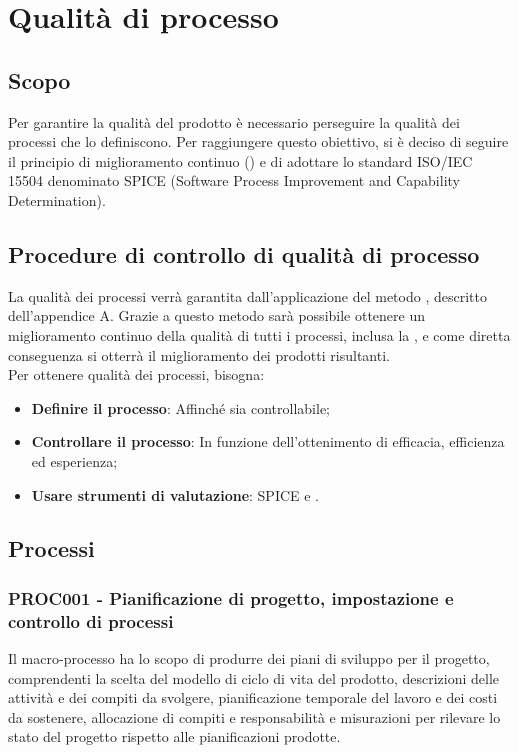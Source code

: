 \documentclass[PianoDiQualifica.tex]{subfiles}
\begin{document}
\chapter{Qualità di processo}

\section{Scopo} 
Per garantire la qualità del prodotto è necessario perseguire la qualità dei processi che lo definiscono.
Per raggiungere questo obiettivo, si è deciso di seguire il principio di miglioramento continuo () e di adottare lo standard ISO/IEC 15504 denominato SPICE (Software Process Improvement and Capability Determination).

\section{Procedure di controllo di qualità di processo}
La qualità dei processi verrà garantita dall'applicazione del metodo , descritto dell'appendice A. Grazie a questo metodo sarà possibile ottenere un miglioramento continuo della qualità di tutti i processi, inclusa la , e come diretta conseguenza si otterrà il miglioramento dei prodotti risultanti.\\Per ottenere qualità dei processi, bisogna:
\begin{itemize}
	\item \textbf{Definire il processo}: Affinché sia controllabile;
	\item \textbf{Controllare il processo}: In funzione dell'ottenimento di efficacia, efficienza ed esperienza;
	\item \textbf{Usare strumenti di valutazione}: SPICE e .
\end{itemize}

\section{Processi}

\subsection{PROC001 - Pianificazione di progetto, impostazione e controllo di processi}
Il macro-processo ha lo scopo di produrre dei piani di sviluppo per il progetto, comprendenti la scelta del modello di ciclo di vita del prodotto, descrizioni delle attività e dei compiti da svolgere, pianificazione temporale del lavoro e dei costi da sostenere, allocazione di compiti e responsabilità e misurazioni per rilevare lo stato del progetto rispetto alle pianificazioni prodotte.
\end{document}
